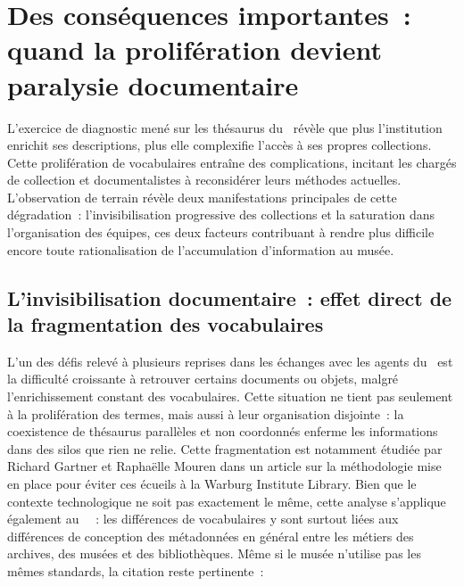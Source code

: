 \section{\label{II-A-2}Des conséquences importantes~: quand la prolifération devient paralysie documentaire}

L’exercice de diagnostic mené sur les thésaurus du \mae~révèle que plus l’institution enrichit ses descriptions, plus elle complexifie l’accès à ses propres collections. Cette prolifération de vocabulaires entraîne des complications, incitant les chargés de collection et documentalistes à reconsidérer leurs méthodes actuelles. L’observation de terrain révèle deux manifestations principales de cette dégradation~: l’invisibilisation progressive des collections et la saturation dans l’organisation des équipes, ces deux facteurs contribuant à rendre plus difficile encore toute rationalisation de l’accumulation d’information au musée.

\subsection{L’invisibilisation documentaire~: effet direct de la fragmentation des vocabulaires}

L’un des défis relevé à plusieurs reprises dans les échanges avec les agents du \mae~est la difficulté croissante à retrouver certains documents ou objets, malgré l’enrichissement constant des vocabulaires. Cette situation ne tient pas seulement à la prolifération des termes, mais aussi à leur organisation disjointe~: la coexistence de thésaurus parallèles et non coordonnés enferme les informations dans des silos que rien ne relie. Cette fragmentation est notamment étudiée par Richard Gartner et Raphaëlle Mouren dans un article sur la méthodologie mise en place pour éviter ces écueils à la Warburg Institute Library. Bien que le contexte technologique ne soit pas exactement le même, cette analyse s’applique également au \mae~~: les différences de vocabulaires y sont surtout liées aux différences de conception des métadonnées en général entre les métiers des archives, des musées et des bibliothèques. Même si le musée n’utilise pas les mêmes standards, la citation reste pertinente~:  

